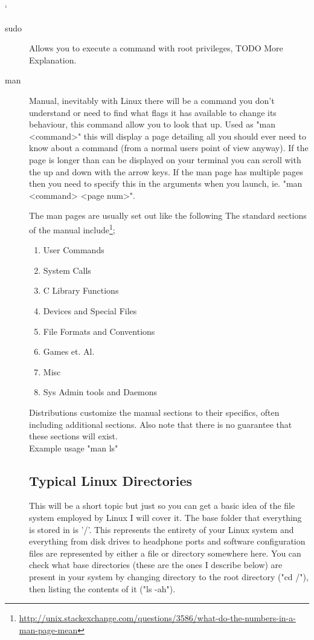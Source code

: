 `\documentclass[a4paper,11pt]{report}
\begin{document}
\begin{description}
				\item[sudo]
					Allows you to execute a command with root privileges, TODO More Explanation.

				\item[man]
					Manual, inevitably with Linux there will be a command you don't understand or need to find what flags it has available to change its behaviour, this command allow you to look that up.
					Used as "man <command>" this will display a page detailing all you should ever need to know about a command (from a normal users point of view anyway).
					If the page is longer than can be displayed on your terminal you can scroll with the up and down with the arrow keys.
					If the man page has multiple pages then you need to specify this in the arguments when you launch, ie. "man <command> <page num>".

					The man pages are usually set out like the following
	    		The standard sections of the manual include\footnote{\url{http://unix.stackexchange.com/questions/3586/what-do-the-numbers-in-a-man-page-mean}};
					\begin{enumerate}
	    			\item User Commands
						\item System Calls
						\item C Library Functions
						\item Devices and Special Files
						\item File Formats and Conventions
						\item Games et. Al.
						\item Misc
						\item Sys Admin tools and Daemons

					\end{enumerate}

    			Distributions customize the manual sections to their specifics, often including additional sections.
					Also note that there is no guarantee that these sections will exist.\\

						Example usage "man ls"
					\pagebreak{}

					\subsection{Typical Linux Directories}
						This will be a short topic but just so you can get a basic idea of the file system employed by Linux I will cover it.
						The base folder that everything is stored in is '/'.
						This represents the entirety of your Linux system and everything from disk drives to headphone ports and software configuration files are represented by either a file or directory somewhere here.
						You can check what base directories (these are the ones I describe below) are present in your system by changing directory to the root directory ("cd /"), then listing the contents of it ("ls -ah").\\


\end{description}
\end{document}

